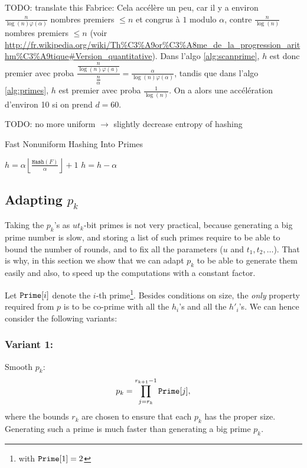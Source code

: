 \documentclass[11pt]{llncs}
\newcommand{\Hash}{\ensuremath{\mathtt{Hash}}}
\begin{document}
TODO: translate this
Fabrice: Cela accélère un peu, car il y a environ $\frac{n}{\log(n) \varphi(\alpha)}$ nombres premiers $\le n$ et congrus à $1$ modulo $\alpha$, contre $\frac{n}{\log(n)}$ nombres premiers $\le n$ (voir \url{http://fr.wikipedia.org/wiki/Th%C3%A9or%C3%A8me_de_la_progression_arithm%C3%A9tique#Version_quantitative}).
Dans l'algo \ref{alg:scanprime}, $h$ est donc premier avec proba $\dfrac{\frac{n}{\log(n) \varphi(a)}}{\frac{n}{\alpha}} = \frac{\alpha}{\log(n) \varphi(\alpha)}$, tandis que dans l'algo \ref{alg:primes}, $h$ est premier avec proba $\frac{1}{\log(n)}$.
On a alors une accélération d'environ 10 si on prend $d=60$.

TODO: no more uniform $\longrightarrow$ slightly decrease entropy of hashing

\begin{algorithm}[t]
  \caption{Fast Nonuniform Hashing Into Primes}
  \label{alg:scanprime}
  \begin{algorithmic}[1]
  \State $h =\alpha \left\lfloor\frac{\Hash(F)}{\alpha}\right\rfloor+1$
\State $h = h-\alpha$
\EndWhile
\State {}
  \end{algorithmic}
\end{algorithm}

\subsection{Adapting $p_k$}
\label{sec:choicep}

Taking the $p_k$'s as $ut_k$-bit primes is not very practical, because generating a big prime number is slow, and storing a list of such primes require to be able to bound the number of rounds, and to fix all the parameters ($u$ and $t_1,t_2,\dots$).
That is why, in this section we show that we can adapt $p_k$ to be able to generate them easily and also, to speed up the computations with a constant factor.

Let $\mbox{{\tt Prime}}[i]$ denote the $i$-th prime\footnote{with $\mbox{{\tt Prime}}[1]=2$}. Besides conditions on size, the \textit{only} property required from $p$ is to be co-prime with all the $h_i$'s and all the $h'_i$'s. We can hence consider the following variants:
\subsubsection{Variant 1:} Smooth $p_k$:
\[ p_k=\prod_{j=r_k}^{r_{k+1}-1} \mbox{{\tt Prime}}[j], \]
where the bounds $r_k$ are chosen to ensure that each $p_k$ has the proper size.
Generating such a prime is much faster than generating a big prime $p_k$.
\end{document}
